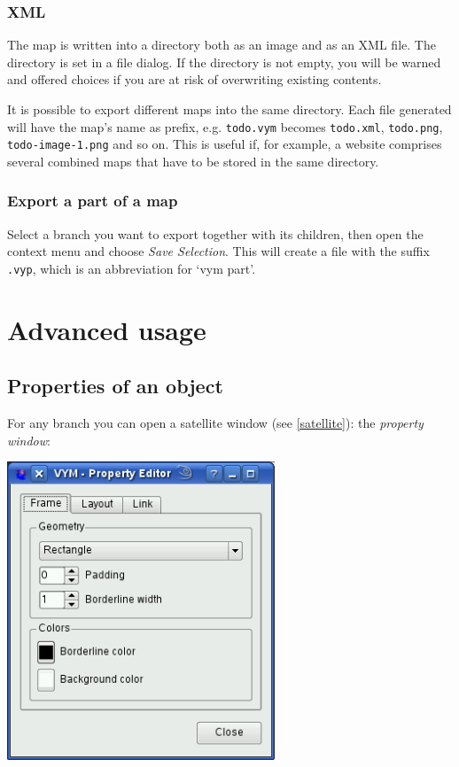 \documentclass[12pt,a4paper]{article}
\begin{document}
\subsubsection*{XML} \label{xmlexport}
The map is written into a directory both as an image and as an XML file.
The directory is set in a file dialog. If the directory is not empty,
you will be warned and offered choices if you are at risk of overwriting
existing contents.

It is possible to export different maps into the same directory. Each
file generated will have the map's name as prefix, e.g. {\tt todo.vym}
becomes {\tt todo.xml}, {\tt todo.png}, {\tt todo-image-1.png} and so
on. This is useful if, for example, a website comprises several combined
maps that have to be stored in the same directory.

\subsubsection*{Export a part of a map}
Select a branch you want to export together with its children, then open
the context menu and choose {\em Save Selection}. This will create a
file with the suffix {\tt .vyp}, which is an abbreviation for \lq vym
part\rq.


\section{Advanced usage}

\subsection{Properties of an object} 
For any branch you can open a satellite window (see \ref{satellite}):
the {\em property window}:
\begin{center}
    \includegraphics[width=8cm]{images/propwindow.png}
    \label{propwindow}
\end{center}
\end{document}
